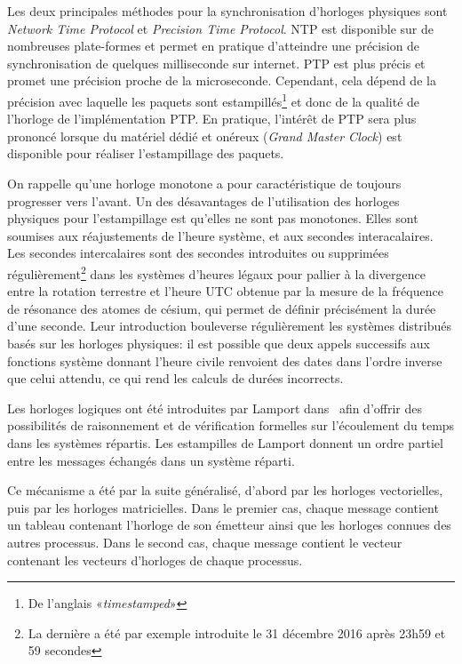 \documentclass[10pt]{article}
\begin{document}
Les deux principales méthodes pour la synchronisation d'horloges physiques sont \emph{Network Time Protocol}\cite{mills1991internet} et \emph{Precision Time Protocol}\cite{peng2009research}. 
NTP est disponible sur de nombreuses plate-formes et permet en pratique d'atteindre une précision de synchronisation de quelques milliseconde sur internet. 
PTP est plus précis et promet une précision proche de la microseconde. 
Cependant, cela dépend de la précision avec laquelle les paquets sont estampillés\footnote{De l'anglais «\textit{timestamped}»} et donc de la qualité de l'horloge de l'implémentation PTP. 
En pratique, l'intérêt de PTP sera plus prononcé lorsque du matériel dédié et onéreux (\emph{Grand Master Clock}) est disponible pour réaliser l'estampillage des paquets.

On rappelle qu'une horloge monotone a pour caractéristique de toujours progresser vers l'avant. 
Un des désavantages de l'utilisation des horloges physiques pour l'estampillage est qu'elles ne sont pas monotones. Elles sont soumises aux réajustements de l'heure système, et aux secondes interacalaires. 
Les secondes intercalaires sont des secondes introduites ou supprimées régulièrement\footnote{La dernière a été par exemple introduite le 31 décembre 2016 après 23h59 et 59 secondes} dans les systèmes d'heures légaux pour pallier à la divergence entre la rotation terrestre et l'heure UTC obtenue par la mesure de la fréquence de résonance des atomes de césium, qui permet de définir précisément la durée d'une seconde. 
Leur introduction bouleverse régulièrement les systèmes distribués basés sur les horloges physiques: il est possible que deux appels successifs aux fonctions système donnant l'heure civile renvoient des dates dans l'ordre inverse que celui attendu, ce qui rend les calculs de durées incorrects.

Les horloges logiques ont été introduites par Lamport dans~\cite{lamport1978time} afin d'offrir des possibilités de raisonnement et de vérification formelles sur l'écoulement du temps dans les systèmes répartis.
Les estampilles de Lamport donnent un ordre partiel entre les messages échangés dans un système réparti.

Ce mécanisme a été par la suite généralisé, d'abord par les horloges vectorielles, puis par les horloges matricielles. 
Dans le premier cas, chaque message contient un tableau contenant l'horloge de son émetteur ainsi que les horloges connues des autres processus. Dans le second cas, chaque message contient le vecteur contenant les vecteurs d'horloges de chaque processus.
\end{document}

